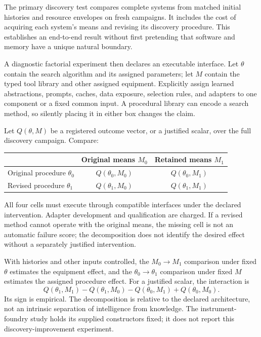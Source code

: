 \documentclass[10pt,a4paper]{article}
\begin{document}
The primary discovery test compares complete systems from matched initial histories and resource envelopes on fresh campaigns. It includes the cost of acquiring each system's means and revising its discovery procedure. This establishes an end-to-end result without first pretending that software and memory have a unique natural boundary.

A diagnostic factorial experiment then declares an executable interface. Let $\theta$ contain the search algorithm and its assigned parameters; let $M$ contain the typed tool library and other assigned equipment. Explicitly assign learned abstractions, prompts, caches, data exposure, selection rules, and adapters to one component or a fixed common input. A procedural library can encode a search method, so silently placing it in either box changes the claim.

Let $Q(\theta,M)$ be a registered outcome vector, or a justified scalar, over the full discovery campaign. Compare:
\begin{center}
\begin{tabular}{@{}lcc@{}}
\toprule
 & \textbf{Original means $M_0$} & \textbf{Retained means $M_1$}\\
\midrule
Original procedure $\theta_0$ & $Q(\theta_0,M_0)$ & $Q(\theta_0,M_1)$\\
Revised procedure $\theta_1$ & $Q(\theta_1,M_0)$ & $Q(\theta_1,M_1)$\\
\bottomrule
\end{tabular}
\end{center}
All four cells must execute through compatible interfaces under the declared intervention. Adapter development and qualification are charged. If a revised method cannot operate with the original means, the missing cell is not an automatic failure score; the decomposition does not identify the desired effect without a separately justified intervention.

With histories and other inputs controlled, the $M_0\!\to M_1$ comparison under fixed $\theta$ estimates the equipment effect, and the $\theta_0\!\to\theta_1$ comparison under fixed $M$ estimates the assigned procedure effect. For a justified scalar, the interaction is
\begin{equation}
 Q(\theta_1,M_1)-Q(\theta_1,M_0)-Q(\theta_0,M_1)+Q(\theta_0,M_0).
\end{equation}
Its sign is empirical. The decomposition is relative to the declared architecture, not an intrinsic separation of intelligence from knowledge. The instrument-foundry study holds its supplied constructors fixed; it does not report this discovery-improvement experiment.
\end{document}
